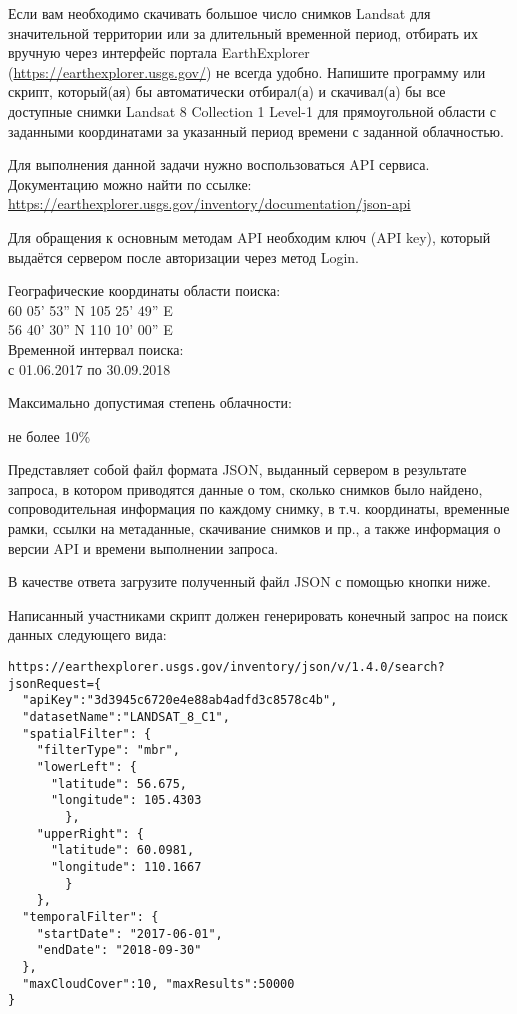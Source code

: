 
Если вам необходимо скачивать большое число снимков Landsat для значительной территории или за 
длительный временной период, отбирать их вручную через интерфейс портала EarthExplorer (\url{https://earthexplorer.usgs.gov/}) не всегда удобно. Напишите программу или скрипт, который(ая) бы автоматически отбирал(а) и скачивал(а) бы все доступные снимки Landsat 8 Collection 1 Level-1 для прямоугольной области с заданными координатами за указанный период времени с заданной облачностью.

Для выполнения данной задачи нужно воспользоваться API сервиса. Документацию можно найти по ссылке:\\
\url{https://earthexplorer.usgs.gov/inventory/documentation/json-api}

Для обращения к основным методам API необходим ключ (API key), который выдаётся сервером после авторизации через метод Login.


Географические координаты области поиска:\\
60 05’ 53” N 105 25’ 49” E\\
56 40’ 30” N 110 10’ 00” E\\

Временной интервал поиска:\\
с 01.06.2017 по 30.09.2018

Максимально допустимая степень облачности:

не более 10\%

\outputfmtSection

Представляет собой файл формата JSON, выданный сервером в результате запроса, в котором приводятся данные о
том, сколько снимков было найдено, сопроводительная информация по каждому
снимку, в т.ч. координаты, временные рамки, ссылки на метаданные, скачивание
снимков и пр., а также информация о версии API и времени выполнении запроса. 

В качестве ответа загрузите полученный файл JSON с помощью кнопки ниже.

\solutionSection

Написанный участниками скрипт должен генерировать конечный запрос на поиск данных следующего вида:

\begin{verbatim}
https://earthexplorer.usgs.gov/inventory/json/v/1.4.0/search?jsonRequest={
  "apiKey":"3d3945c6720e4e88ab4adfd3c8578c4b",
  "datasetName":"LANDSAT_8_C1",
  "spatialFilter": {
    "filterType": "mbr",
    "lowerLeft": {
      "latitude": 56.675,
      "longitude": 105.4303
        },
    "upperRight": {
      "latitude": 60.0981,
      "longitude": 110.1667
        }
    },
  "temporalFilter": {
    "startDate": "2017-06-01",
    "endDate": "2018-09-30"
  },
  "maxCloudCover":10, "maxResults":50000
}
\end{verbatim}

